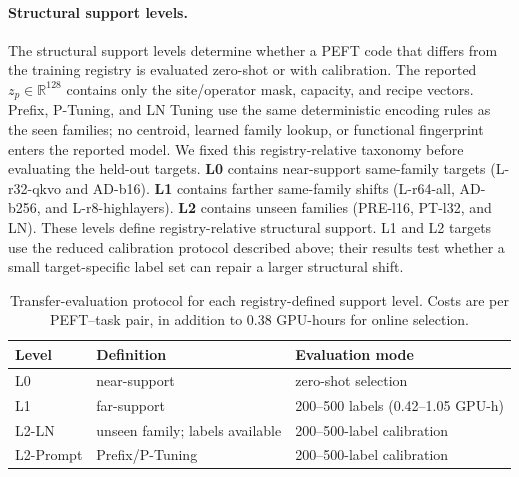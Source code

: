 \paragraph{Structural support levels.}
The structural support levels determine whether a PEFT code that differs from
the training registry is evaluated zero-shot or with calibration. The reported
$z_p\in\mathbb{R}^{128}$ contains only the site/operator mask, capacity, and
recipe vectors. Prefix, P-Tuning, and LN Tuning use the same
deterministic encoding rules as the seen families; no centroid, learned family
lookup, or functional fingerprint enters the reported model. We fixed this
registry-relative taxonomy before evaluating the held-out targets. \textbf{L0}
contains near-support
same-family targets (L-r32-qkvo and AD-b16). \textbf{L1} contains farther
same-family shifts (L-r64-all, AD-b256, and L-r8-highlayers). \textbf{L2}
contains unseen families (PRE-l16, PT-l32, and LN). These levels define
registry-relative structural support. L1 and L2 targets use the reduced
calibration protocol described above; their results test whether a small
target-specific label set can repair a larger structural shift.

\begin{table}[t]
\centering
\small
\setlength{\tabcolsep}{3pt}
\begin{tabular}{@{}p{}p{}p{}@{}}
\toprule
Level & Definition & Evaluation mode \\
\midrule
L0 & near-support & zero-shot selection \\
L1 & far-support & 200--500 labels (0.42--1.05 GPU-h) \\
L2-LN & unseen family; labels available & 200--500-label calibration \\
L2-Prompt & Prefix/P-Tuning & 200--500-label calibration \\
\bottomrule
\end{tabular}
\caption{Transfer-evaluation protocol for each registry-defined support level.
Costs are per PEFT--task pair, in addition to 0.38 GPU-hours for online
selection.}
\label{tab:protocol}
\end{table}


